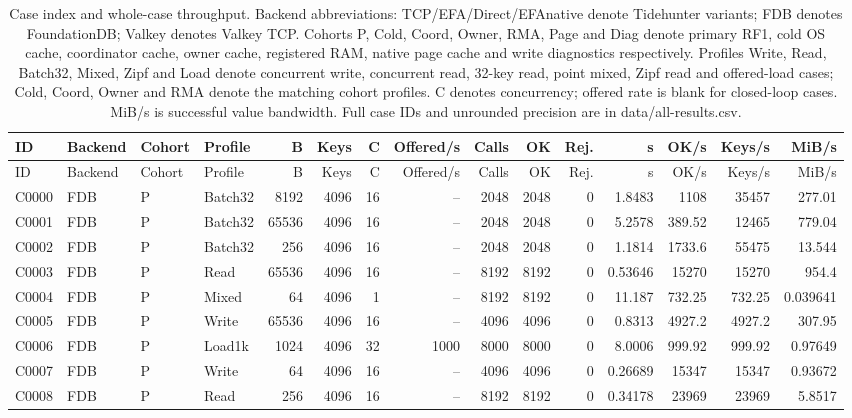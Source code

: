 \begin{landscape}
\scriptsize
\setlength{\tabcolsep}{2pt}
\sloppy
\begin{longtable}{llllrrrrrrrrrrr}
\caption{Case index and whole-case throughput. Backend abbreviations: TCP/EFA/Direct/EFAnative denote Tidehunter variants; FDB denotes FoundationDB; Valkey denotes Valkey TCP. Cohorts P, Cold, Coord, Owner, RMA, Page and Diag denote primary RF1, cold OS cache, coordinator cache, owner cache, registered RAM, native page cache and write diagnostics respectively. Profiles Write, Read, Batch32, Mixed, Zipf and Load denote concurrent write, concurrent read, 32-key read, point mixed, Zipf read and offered-load cases; Cold, Coord, Owner and RMA denote the matching cohort profiles. C denotes concurrency; offered rate is blank for closed-loop cases. MiB/s is successful value bandwidth. Full case IDs and unrounded precision are in data/all-results.csv.}\label{data-cases}\\
\toprule
ID & Backend & Cohort & Profile & B & Keys & C & Offered/s & Calls & OK & Rej. & s & OK/s & Keys/s & MiB/s\\
\midrule
\endfirsthead
\toprule
ID & Backend & Cohort & Profile & B & Keys & C & Offered/s & Calls & OK & Rej. & s & OK/s & Keys/s & MiB/s\\
\midrule
\endhead
\bottomrule
\endfoot
C0000 & FDB & P & Batch32 & 8192 & 4096 & 16 & -- & 2048 & 2048 & 0 & 1.8483 & 1108 & 35457 & 277.01\\
C0001 & FDB & P & Batch32 & 65536 & 4096 & 16 & -- & 2048 & 2048 & 0 & 5.2578 & 389.52 & 12465 & 779.04\\
C0002 & FDB & P & Batch32 & 256 & 4096 & 16 & -- & 2048 & 2048 & 0 & 1.1814 & 1733.6 & 55475 & 13.544\\
C0003 & FDB & P & Read & 65536 & 4096 & 16 & -- & 8192 & 8192 & 0 & 0.53646 & 15270 & 15270 & 954.4\\
C0004 & FDB & P & Mixed & 64 & 4096 & 1 & -- & 8192 & 8192 & 0 & 11.187 & 732.25 & 732.25 & 0.039641\\
C0005 & FDB & P & Write & 65536 & 4096 & 16 & -- & 4096 & 4096 & 0 & 0.8313 & 4927.2 & 4927.2 & 307.95\\
C0006 & FDB & P & Load1k & 1024 & 4096 & 32 & 1000 & 8000 & 8000 & 0 & 8.0006 & 999.92 & 999.92 & 0.97649\\
C0007 & FDB & P & Write & 64 & 4096 & 16 & -- & 4096 & 4096 & 0 & 0.26689 & 15347 & 15347 & 0.93672\\
C0008 & FDB & P & Read & 256 & 4096 & 16 & -- & 8192 & 8192 & 0 & 0.34178 & 23969 & 23969 & 5.8517\\

\end{longtable}
\end{landscape}
